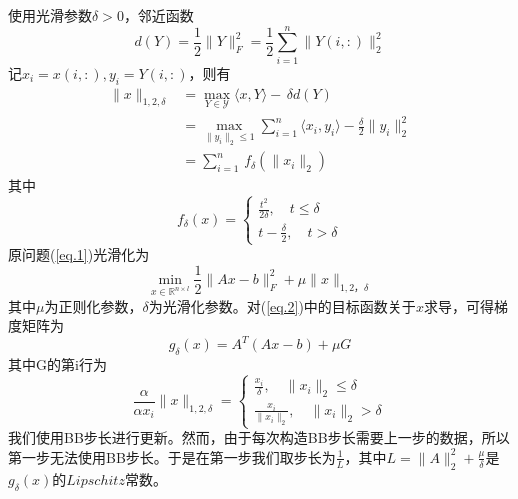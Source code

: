 \documentclass[a4paper,12pt]{ctexart}
\begin{document}
		使用光滑参数$\delta>0$，邻近函数
		$$d(Y)=\frac{1}{2}\|Y\|_F^2=\frac{1}{2}\sum_{i=1}^{n}\|Y(i,:)\|_2^2$$
		记$x_i=x(i,:),y_i=Y(i,:)$，则有
		$$
		\begin{aligned}
			\|x\|_{1,2,\delta}
			&= \max_{Y\in\mathcal{Y}}\langle x,Y\rangle-\,\delta d(Y)\\
			&= \max_{\|y_i\|_2\le 1}\sum_{i=1}^{n}\langle x_i,y_i\rangle-\frac{\delta}{2}\|y_i\|_2^2\\
			&= \sum_{i=1}^{n}\,f_{\delta}(\|x_i\|_2)
		\end{aligned}
		$$
		其中
		$$ f_{\delta}(x)=
		\left\{
		\begin{aligned}
			\frac{t^2}{2\delta},\quad t\le \delta \\
			t-\frac{\delta}{2}, \quad t>\delta 
		\end{aligned}
		\right.
		$$
		原问题(\ref{eq.1})光滑化为
		\begin{equation}
			\min_{x \in \mathbb{R}^{n \times l}} \frac{1}{2} \|Ax - b\|_F^2 + \mu \|x\|_{1,2，\delta}
			\label{eq.2}
		\end{equation}
		其中$\mu$为正则化参数，$\delta$为光滑化参数。对(\ref{eq.2})中的目标函数关于$x$求导，可得梯度矩阵为
		$$g_{\delta}(x)=A^T(Ax-b)+\mu G$$
		其中G的第i行为
		$$
		\frac{\alpha}{\alpha x_i} \|x\|_{1,2,\delta}=
			\left\{
			\begin{aligned}
				\frac{x_i}{\delta},\quad \|x_i\|_2\le \delta \\
				\frac{x_i}{\|x_i\|_2}, \quad \|x_i\|_2>\delta 
			\end{aligned}
			\right.
		$$
		我们使用BB步长进行更新。然而，由于每次构造BB步长需要上一步的数据，所以第一步无法使用BB步长。于是在第一步我们取步长为$\frac{1}{L}$，其中$L=\|A\|_2^2+\frac{\mu}{\delta}$是$g_{\delta}(x)$的$Lipschitz$常数。
		
\end{document}
